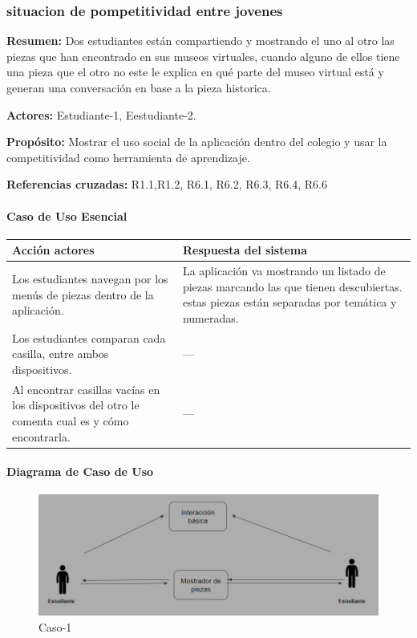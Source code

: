\subsubsection{situacion de pompetitividad entre jovenes}

{\textbf {Resumen:}}
Dos estudiantes están compartiendo y mostrando el uno al otro las piezas que han encontrado en sus museos virtuales, cuando alguno de ellos tiene una pieza que el otro no este le explica en qué parte del museo virtual está y generan una conversación en base a la pieza historica.

{\textbf {Actores:}}
Estudiante-1, Eestudiante-2.

{\textbf {Propósito:}}
Mostrar el uso social de la aplicación dentro del colegio y usar la competitividad como herramienta de aprendizaje.

{\textbf {Referencias cruzadas:}}
R1.1,R1.2, R6.1, R6.2, R6.3, R6.4, R6.6

\paragraph{Caso de Uso Esencial}

\begin{longtable}{|p{5cm}|p{8cm}|}
\hline 
Acción actores & Respuesta del sistema \\ 
\hline 
Los estudiantes navegan por los menús de piezas dentro de la aplicación. & La aplicación va mostrando un listado de piezas marcando las que tienen descubiertas.
estas piezas están separadas por temática y numeradas.
 \\ 
\hline 
Los estudiantes comparan cada casilla, entre ambos dispositivos. & --- \\
\hline 
Al encontrar casillas vacías en los dispositivos del otro le comenta cual es y cómo encontrarla.  & --- \\
\hline 
\end{longtable}

\paragraph{Diagrama de Caso de Uso}

\begin{figure}[H]
\centerline{\includegraphics[width=15cm]{imgs/CasoUso_3.PNG}}
\caption{Caso-1}
\label{fig}
\end{figure}

